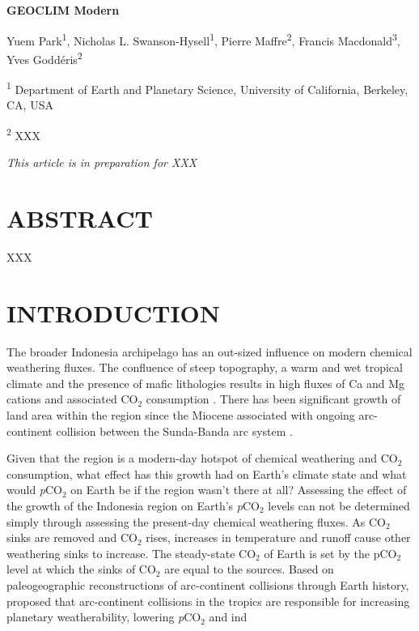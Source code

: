 \documentclass[11pt,letterpaper]{article}
\newcommand{\pCOtwo}{\textit{p}CO$_{2}$\xspace}
\newcommand{\COtwo}{CO$_{2}$\xspace}
\begin{document}
\begin{flushleft}
{\Large \textbf{GEOCLIM Modern}}

Yuem Park\textsuperscript{1},
Nicholas L. Swanson-Hysell\textsuperscript{1},
Pierre Maffre\textsuperscript{2},
Francis Macdonald\textsuperscript{3},
Yves Godd\'eris\textsuperscript{2}

\bigskip
\textsuperscript{1} Department of Earth and Planetary Science, University of California, Berkeley, CA, USA

\textsuperscript{2} XXX
\bigskip

\end{flushleft}

\noindent\textit{This article is in preparation for XXX}

\linenumbers

\section*{ABSTRACT \label{sec:ABSTRACT}}

XXX

\section*{INTRODUCTION \label{sec:INTRODUCTION}}

The broader Indonesia archipelago has an out-sized influence on modern chemical weathering fluxes. The confluence of steep topography, a warm and wet tropical climate and the presence of mafic lithologies results in high fluxes of Ca and Mg cations and associated \COtwo consumption \citep{Hartmann2009a,Hartmann2014a}. There has been significant growth of land area within the region since the Miocene associated with ongoing arc-continent collision between the Sunda-Banda arc system \citep{Molnar2015a}.

Given that the region is a modern-day hotspot of chemical weathering and \COtwo consumption, what effect has this growth had on Earth's climate state and what would \pCOtwo on Earth be if the region wasn't there at all? Assessing the effect of the growth of the Indonesia region on Earth's \pCOtwo levels can not be determined simply through assessing the present-day chemical weathering fluxes. As \COtwo sinks are removed and \COtwo rises, increases in temperature and runoff cause other weathering sinks to increase. The steady-state \COtwo of Earth is set by the pCO$_2$ level at which the sinks of \COtwo are equal to the sources. Based on paleogeographic reconstructions of arc-continent collisions through Earth history, \citet{Macdonald2019a} proposed that arc-continent collisions in the tropics are responsible for increasing planetary weatherability, lowering \pCOtwo and ind
\end{document}
